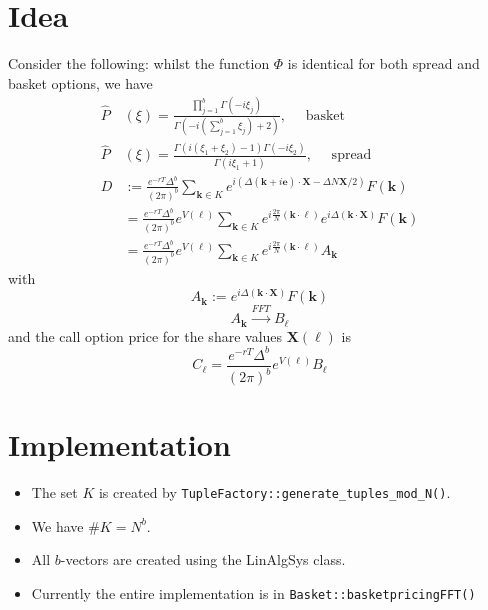 \documentclass[10pt]{amsart}
\newcommand{\vect}[1]{\boldsymbol{#1}}
\begin{document}
\section{Idea}
Consider the following: whilst the function $\Phi$ is identical for both spread  and basket options,
we have
\begin{align}
 \widehat{P}& (\xi)=\frac{\prod_{j=1}^b\Gamma(-i\xi_j)}{\Gamma(-i(\sum_{j=1}^b\xi_j)+2)},
 \quad\text{ basket}\\
 \widehat{P}& (\xi)=\frac{\Gamma(i(\xi_1+\xi_2)-1)\Gamma(-i\xi_2)}{\Gamma(i\xi_1+1)}, \quad
 \text{ spread}\\
  D &:= \frac{e^{-rT}\Delta^b}{(2\pi)^b}
  \sum_{\vect{k} \in K}
  e^{i\left( \Delta (\vect{k} + i\vect{e}) \cdot \vect{X} - \Delta N \vect{X} / 2 \right)} F(\vect{k}) \\
  &= \frac{e^{-rT}\Delta^b}{(2\pi)^b}
  e^{V(\vect{\ell})}
  \sum_{\vect{k} \in K}
  e^{i \frac{2\pi}{N} (\vect{k} \cdot \vect{\ell})}
  e^{i\Delta (\vect{k} \cdot \vect{X})} F(\vect{k}) \\
  &= \frac{e^{-rT}\Delta^b}{(2\pi)^b}
  e^{V(\vect{\ell})}
  \sum_{\vect{k} \in K}
  e^{i \frac{2\pi}{N} (\vect{k} \cdot \vect{\ell})}
  A_{\vect{k}}
\end{align}
with
\begin{equation}
A_{\vect{k}} := e^{i \Delta (\vect{k} \cdot \vect{X})} F(\vect{k})
\end{equation}
\begin{equation}
A_{\vect{k}} \xrightarrow{FFT} B_{\vect{\ell}}
\end{equation}
and the call option price for the share values $\vect{X(\ell)}$ is
\begin{equation}
C_{\vect{\ell}} = \frac{e^{-rT} \Delta^b} {(2\pi)^b} e^{V(\vect{\ell})} B_{\vect{\ell}}
\end{equation}

\section{Implementation}

\begin{itemize}
\item The set $K$ is created by \lstinline!TupleFactory::generate_tuples_mod_N()!.
\item We have $\#K = N^b$.
\item All $b$-vectors are created using the LinAlgSys class.
\item Currently the entire implementation is in \lstinline!Basket::basketpricingFFT()!
\end {itemize}
\end{document}

